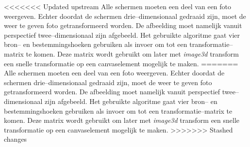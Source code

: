 
<<<<<<< Updated upstream
	Alle schermen moeten een deel van een foto weergeven. Echter doordat de schermen drie--dimensionaal gedraaid zijn, moet de weer te geven foto getransformeerd worden. De afbeelding moet namelijk vanuit perspectief twee--dimensionaal zijn afgebeeld. Het gebruikte algoritme gaat vier bron-- en bestemmingshoeken gebruiken als invoer om tot een transformatie--matrix te komen. Deze matrix wordt gebruikt om later met {\it image3d} transform een snelle transformatie op een canvaselement mogelijk te maken.
=======
Alle schermen moeten een deel van een foto weergeven. Echter doordat de schermen drie--dimensionaal gedraaid zijn, moet de weer te geven foto getransformeerd worden. De afbeelding moet namelijk vanuit perspectief twee--dimensionaal zijn afgebeeld. Het gebruikte algoritme gaat vier bron-- en bestemmingshoeken gebruiken als invoer om tot een transformatie--matrix te komen. Deze matrix wordt gebruikt om later met {\it image3d} transform een snelle transformatie op een canvaselement mogelijk te maken.
>>>>>>> Stashed changes

